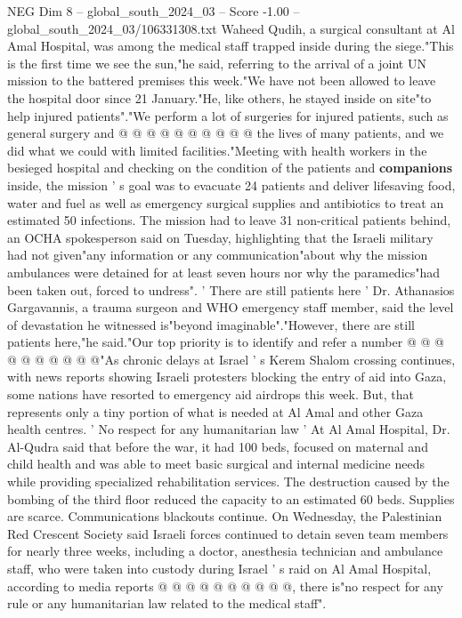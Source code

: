 \begin{textsample}{NEG Dim 8 – global\_south\_2024\_03 – Score -1.00 – global\_south\_2024\_03/106331308.txt}
Waheed Qudih, a surgical consultant at Al Amal Hospital, was among the medical staff trapped inside during the siege."This is the first time we see the sun,"he said, referring to the arrival of a joint UN mission to the battered premises this week."We have not been allowed to leave the hospital door since 21 January."He, like others, he stayed inside on site"to help injured patients"."We perform a lot of surgeries for injured patients, such as general surgery and @ @ @ @ @ @ @ @ @ @ the lives of many patients, and we did what we could with limited facilities."Meeting with health workers in the besieged hospital and checking on the condition of the patients and \textbf{companions} inside, the mission ' s goal was to evacuate 24 patients and deliver lifesaving food, water and fuel as well as emergency surgical supplies and antibiotics to treat an estimated 50 infections.
The mission had to leave 31 non-critical patients behind, an OCHA spokesperson said on Tuesday, highlighting that the Israeli military had not given"any information or any communication"about why the mission ambulances were detained for at least seven hours nor why the paramedics"had been taken out, forced to undress". ' There are still patients here ' Dr.
Athanasios Gargavannis, a trauma surgeon and WHO emergency staff member, said the level of devastation he witnessed is"beyond imaginable"."However, there are still patients here,"he said."Our top priority is to identify and refer a number @ @ @ @ @ @ @ @ @ @"As chronic delays at Israel ' s Kerem Shalom crossing continues, with news reports showing Israeli protesters blocking the entry of aid into Gaza, some nations have resorted to emergency aid airdrops this week.
But, that represents only a tiny portion of what is needed at Al Amal and other Gaza health centres. ' No respect for any humanitarian law ' At Al Amal Hospital, Dr.
Al-Qudra said that before the war, it had 100 beds, focused on maternal and child health and was able to meet basic surgical and internal medicine needs while providing specialized rehabilitation services.
The destruction caused by the bombing of the third floor reduced the capacity to an estimated 60 beds.
Supplies are scarce.
Communications blackouts continue.
On Wednesday, the Palestinian Red Crescent Society said Israeli forces continued to detain seven team members for nearly three weeks, including a doctor, anesthesia technician and ambulance staff, who were taken into custody during Israel ' s raid on Al Amal Hospital, according to media reports @ @ @ @ @ @ @ @ @ @, there is"no respect for any rule or any humanitarian law related to the medical staff".

\end{textsample}
